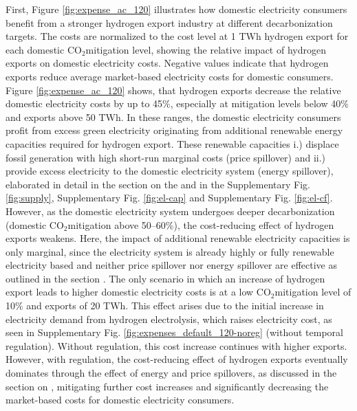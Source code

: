 \documentclass[5p,numafflabel]{elsarticle}
\newcommand{\co}{\ce{CO2}~}
\def\co{CO${}_2${\:}}
\begin{document}
First, Figure \ref{fig:expense_ac_120} illustrates how domestic electricity consumers benefit from a stronger hydrogen export industry at different decarbonization targets. The costs are normalized to the cost level at 1 TWh hydrogen export for each domestic \co mitigation level, showing the relative impact of hydrogen exports on domestic electricity costs. Negative values indicate that hydrogen exports reduce average market-based electricity costs for domestic consumers.
Figure \ref{fig:expense_ac_120} shows, that hydrogen exports decrease the relative domestic electricity costs by up to 45\%, especially at mitigation levels below 40\% and exports above 50 TWh. 
In these ranges, the domestic electricity consumers profit from excess green electricity originating from additional renewable energy capacities required for hydrogen export. These renewable capacities i.) displace fossil generation with high short-run marginal costs (price spillover) and ii.) provide excess electricity to the domestic electricity system (energy spillover), elaborated in detail in the section on the  and in the Supplementary Fig. \ref{fig:supply}, Supplementary Fig. \ref{fig:el-cap} and Supplementary Fig. \ref{fig:el-cf}.
However, as the domestic electricity system undergoes deeper decarbonization (domestic \co mitigation above 50--60\%), the cost-reducing effect of hydrogen exports weakens. Here, the impact of additional renewable electricity capacities is only marginal, since the electricity system is already highly or fully renewable electricity based and neither price spillover nor energy spillover are effective as outlined in the section .
The only scenario in which an increase of hydrogen export leads to higher domestic electricity costs is at a low \co mitigation level of 10\% and exports of 20 TWh.
This effect arises due to the initial increase in electricity demand from hydrogen electrolysis, which raises electricity cost, as seen in Supplementary Fig. \ref{fig:expenses_default_120-noreg} (without temporal regulation). Without regulation, this cost increase continues with higher exports. However, with regulation, the cost-reducing effect of hydrogen exports eventually dominates through the effect of energy and price spillovers, as discussed in the section on , mitigating further cost increases and significantly decreasing the market-based costs for domestic electricity consumers.
\end{document}

